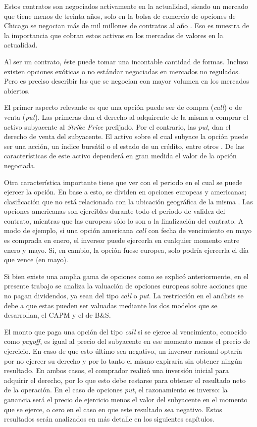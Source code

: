 Estos contratos son negociados activamente en la actualidad, siendo un mercado que tiene menos de treinta años, solo en la bolsa de comercio de opciones de Chicago se negocian más de mil millones de contratos al año \cite{cboe}. Eso es muestra de la importancia que cobran estos activos en los mercados de valores en la actualidad.

Al ser un contrato, éste puede tomar una incontable cantidad de formas. Incluso existen opciones exóticas o no estándar negociadas en mercados no regulados. Pero es preciso describir las que se negocian con mayor volumen en los mercados abiertos.

El primer aspecto relevante es que una opción puede ser de compra (\textit{call}) o de venta (\textit{put}). Las primeras dan el derecho al adquirente de la misma a comprar el activo subyacente al \textit{Strike Price} prefijado. Por el contrario, las \textit{put}, dan el derecho de venta del subyacente. El activo sobre el cual subyace la opción puede ser una acción, un índice bursátil o el estado de un crédito, entre otros \cite{elton}. De las características de este activo dependerá en gran medida el valor de la opción negociada.

Otra característica importante tiene que ver con el periodo en el cual se puede ejercer la opción. En base a esto, se dividen en opciones europeas y americanas; clasificación que no está relacionada con la ubicación geográfica de la misma \cite{hull}. Las opciones americanas son ejercibles durante todo el periodo de validez del contrato, mientras que las europeas sólo lo son a la finalización del contrato. A modo de ejemplo, si una opción americana \textit{call} con fecha de vencimiento en mayo es comprada en enero, el inversor puede ejercerla en cualquier momento entre enero y mayo. Si, en cambio, la opción fuese europea, solo podría ejercerla el día que vence (en mayo).

Si bien existe una amplia gama de opciones como se explicó anteriormente, en el presente trabajo se analiza la valuación de opciones europeas sobre acciones que no pagan dividendos, ya sean del tipo \textit{call} o \textit{put}. La restricción en el análisis se debe a que estas pueden ser valuadas mediante los dos modelos que se desarrollan, el CAPM y el de B\&S.

El monto que paga una opción del tipo \textit{call} si se ejerce al vencimiento, conocido como \textit{payoff}, es igual al precio del subyacente en ese momento menos el precio de ejercicio. En caso de que esto último sea negativo, un inversor racional optaría por no ejercer su derecho y por lo tanto el mismo expiraría sin obtener ningún resultado. En ambos casos, el comprador realizó una inversión inicial para adquirir el derecho, por lo que esto debe restarse para obtener el resultado neto de la operación. En el caso de opciones \textit{put}, el razonamiento es inverso: la ganancia será el precio de ejercicio menos el valor del subyacente en el momento que se ejerce, o cero en el caso en que este resultado sea negativo. Estos resultados serán analizados en más detalle en los siguientes capítulos.


